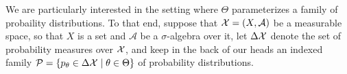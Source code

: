 \begin{phaseout}
%



We are particularly interested in the setting where $\Theta$ parameterizes a family of probaility distributions.
To that end, suppose that $\mathcal X = (X, \mathcal A)$ be a measurable space, so that $X$ is a set and $\mathcal A$ be a $\sigma$-algebra over it, let $\Delta \mathcal X$ denote the set of probability measures over $\mathcal X$,
and keep in the back of our heads an indexed family
$
	\mathcal P =
	\{ p_\theta \in\Delta\mathcal X \mid \theta \in \Theta \}
$ of probability distributions.
\end{phaseout}

%
